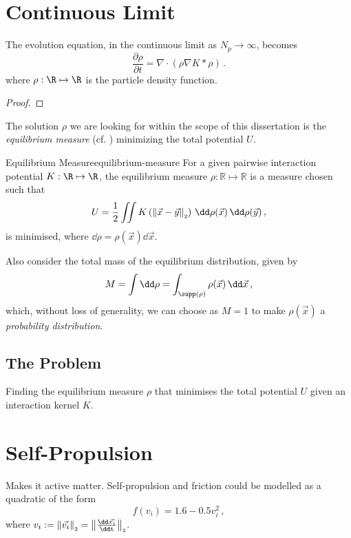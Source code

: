 \section{Continuous Limit}
The evolution equation, in the continuous limit as $N_p \rightarrow \infty$, becomes
\begin{equation}
  \frac{\partial \rho}{\partial t} = \nabla \cdot \left(\rho \nabla K * \rho\right)\,.
  \label{eq:continuous-evolution-equation}
\end{equation}
where $\rho: \R \mapsto \R$ is the particle density function.
\begin{proof}
  \hierKoennteIhreWerbungStehen
\end{proof}
The solution $\rho$ we are looking for within the scope of this dissertation is the \textit{equilibrium measure} (cf. ) minimizing the total potential $U$.

\begin{definition}{Equilibrium Measure}{equilibrium-measure}
  For a given pairwise interaction potential $K: \R \mapsto \R$, the equilibrium measure $\rho: \mathbb{R} \mapsto \mathbb{R}$ is a measure chosen such that
  $$U = \frac{1}{2} \iint K\left(\norm{\vec{x} - \vec{y}}\right) \,\dd\rho(\vec{x})\,\dd\rho(\vec{y})\,,$$
  is minimised, where $\dd\rho = \rho(\vec{x})\dd\vec{x}$.
\end{definition}
Also consider the total mass of the equilibrium distribution, given by
\begin{equation}
  M = \int \dd\rho = \int_{\supp(\rho)} \rho(\vec{x}) \,\dd\vec{x}\,,
  \label{eq:measure-mass}
\end{equation}
which, without loss of generality, we can choose as $M = 1$ to make $\rho(\vec{x})$ a \textit{probability distribution}.



\subsection{The Problem}
\label{sec:the-problem}
Finding the equilibrium measure $\rho$ that minimises the total potential $U$ given an interaction kernel $K$.
\hierKoennteIhreWerbungStehen

\section{Self-Propulsion}
Makes it active matter.
Self-propulsion and friction could be modelled as a quadratic of the form
$$f(v_i) = 1.6 - 0.5 v_i^2\,,$$
where $v_i := \norm{\vec{v_i}} = \norm{\frac{\dd\vec{x_i}}{\ddt}}$.

